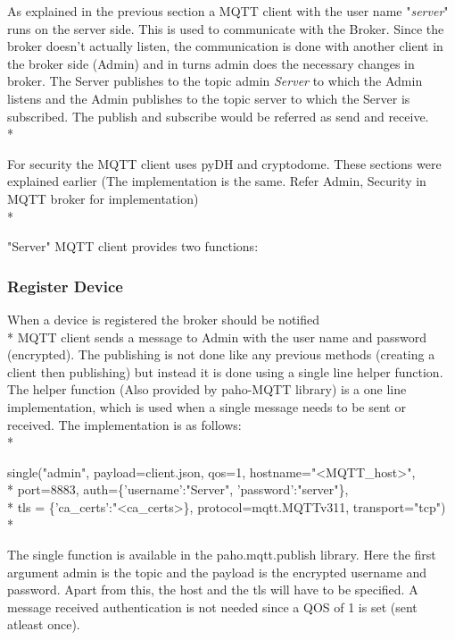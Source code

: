 \documentclass{report}
\begin{document}
As explained in the previous section a MQTT client with the user name "\textit{server}" runs on the server side. This is used to communicate with the Broker. Since the broker doesn't actually listen, the communication is done with another client in the broker side (Admin) and in turns admin does the necessary changes in broker. The Server publishes to the topic admin \textit{Server} to which the Admin listens and the Admin publishes to the topic server to which the Server is subscribed. The publish and subscribe would be referred as send and receive.\\*

For security the MQTT client uses pyDH and cryptodome. These sections were explained earlier (The implementation is the same. Refer Admin, Security in MQTT broker for implementation)\\*

"Server" MQTT client provides two functions:

\subsubsection{Register Device}
When a device is registered the broker should be notified\\*
MQTT client sends a message to Admin with the user name and password (encrypted). The publishing is not done like any previous methods (creating a client then publishing) but instead it is done using a single line helper function. The helper function (Also provided by paho-MQTT library) is a one line implementation, which is used when a single message needs to be sent or received. The implementation is as follows:\\*

single("admin", payload=client.json, qos=1,
hostname="<MQTT\_host>",\\*
\hspace*{1cm}port=8883, auth=\{'username':"Server", 'password':"server"\},\\*
\hspace*{1cm}tls = \{'ca\_certs':"<ca\_certs>\}, protocol=mqtt.MQTTv311, transport="tcp")\\*

The single function is available in the paho.mqtt.publish library.
Here the first argument admin is the topic and the payload is the encrypted username and password. Apart from this, the host and the tls will have to be specified. A message received authentication is not needed since a QOS of 1 is set (sent atleast once).
\end{document}
